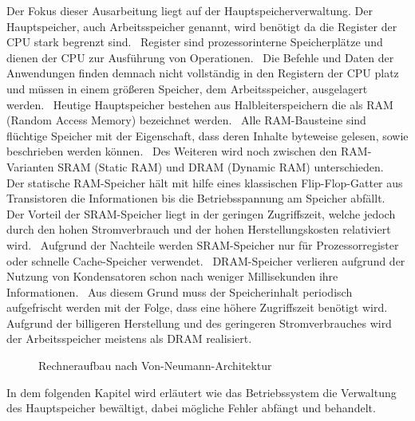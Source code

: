 Der Fokus dieser Ausarbeitung liegt auf der Hauptspeicherverwaltung. Der Hauptspeicher, auch Arbeitsspeicher genannt, wird benötigt da die Register der CPU stark begrenzt sind.~\cite[S.~107]{Herold.2012} Register sind prozessorinterne Speicherplätze und dienen der CPU zur Ausführung von Operationen.~\cite[S.~98]{Herold.2012} Die Befehle und Daten der Anwendungen finden demnach nicht vollständig in den Registern der CPU platz und müssen in einem größeren Speicher, dem Arbeitsspeicher, ausgelagert werden.~\cite[S.~107]{Herold.2012} Heutige Hauptspeicher bestehen aus Halbleiterspeichern die als RAM (Random Access Memory) bezeichnet werden.~\cite[S.~108]{Herold.2012} Alle RAM-Bausteine sind flüchtige Speicher mit der Eigenschaft, dass deren Inhalte byteweise gelesen, sowie beschrieben werden können.~\cite[S.~108]{Herold.2012} Des Weiteren wird noch zwischen den RAM-Varianten SRAM (Static RAM) und DRAM (Dynamic RAM) unterschieden.~\cite[S.~182]{Haberlein.2011} Der statische RAM-Speicher hält mit hilfe eines klassischen Flip-Flop-Gatter aus Transistoren die Informationen bis die Betriebsspannung am Speicher abfällt.~\cite[S.~182]{Haberlein.2011} Der Vorteil der SRAM-Speicher liegt in der geringen Zugriffszeit, welche jedoch durch den hohen Stromverbrauch und der hohen Herstellungskosten relativiert wird.~\cite[S.~108]{Herold.2012} Aufgrund der Nachteile werden SRAM-Speicher nur für Prozessorregister oder schnelle Cache-Speicher verwendet.~\cite[S.~108]{Herold.2012} DRAM-Speicher verlieren aufgrund der Nutzung von Kondensatoren schon nach weniger Millisekunden ihre Informationen.~\cite[S.~183]{Haberlein.2011} Aus diesem Grund muss der Speicherinhalt periodisch aufgefrischt werden mit der Folge, dass eine höhere Zugriffszeit benötigt wird.~\cite[S.~183]{Haberlein.2011} Aufgrund der billigeren Herstellung und des geringeren Stromverbrauches wird der Arbeitsspeicher meistens als DRAM realisiert.~\cite[S.~183]{Haberlein.2011}

\begin{figure}[htb]
	\centering
	\caption{Rechneraufbau nach Von-Neumann-Architektur}
\end{figure}

In dem folgenden Kapitel wird erläutert wie das Betriebssystem die Verwaltung des Hauptspeicher bewältigt, dabei mögliche Fehler abfängt und behandelt.
